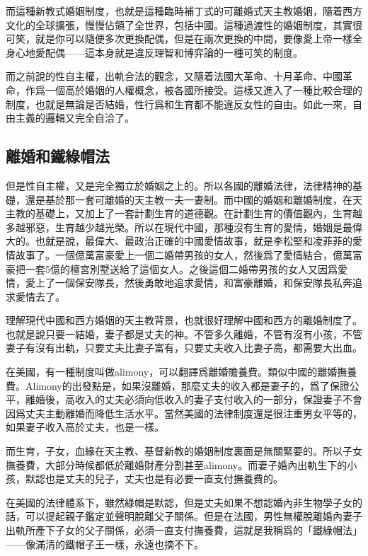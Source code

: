 而這種新教式婚姻制度，也就是這種臨時補丁式的可離婚式天主教婚姻，隨着西方文化的全球擴張，慢慢佔領了全世界，包括中國。這種過渡性的婚姻制度，其實很可笑，就是你可以隨便多次更換配偶，但是在兩次更換的中間，要像愛上帝一樣全身心地愛配偶——這本身就是違反理智和博弈論的一種可笑的制度。

而之前說的性自主權，出軌合法的觀念，又隨着法國大革命、十月革命、中國革命，作爲一個高於婚姻的人權概念，被各國所接受。這樣又進入了一種比較合理的制度，也就是無論是否結婚，性行爲和生育都不能違反女性的自由。如此一來，自由主義的邏輯又完全自洽了。

\subsection{離婚和鐵綠帽法}

但是性自主權，又是完全獨立於婚姻之上的。所以各國的離婚法律，法律精神的基礎，還是基於那一套可離婚的天主教一夫一妻制。而中國的婚姻和離婚制度，在天主教的基礎上，又加上了一套計劃生育的道德觀。在計劃生育的價值觀內，生育越多越邪惡，生育越少越光榮。所以在現代中國，那種沒有生育的愛情，婚姻是最偉大的。也就是說，最偉大、最政治正確的中國愛情故事，就是李松堅和凌菲菲的愛情故事了。一個億萬富豪愛上一個二婚帶男孩的女人，然後爲了愛情結合，億萬富豪把一套5億的檀宮別墅送給了這個女人。之後這個二婚帶男孩的女人又因爲愛情，愛上了一個保安隊長，然後勇敢地追求愛情，和富豪離婚，和保安隊長私奔追求愛情去了。

理解現代中國和西方婚姻的天主教背景，也就很好理解中國和西方的離婚制度了。也就是說只要一結婚，妻子都是丈夫的神。不管多久離婚，不管有沒有小孩，不管妻子有沒有出軌，只要丈夫比妻子富有，只要丈夫收入比妻子高，都需要大出血。

在美國，有一種制度叫做alimony，可以翻譯爲離婚贍養費。類似中國的離婚撫養費。Alimony的出發點是，如果沒離婚，那麼丈夫的收入都是妻子的，爲了保證公平，離婚後，高收入的丈夫必須向低收入的妻子支付收入的一部分，保證妻子不會因爲丈夫主動離婚而降低生活水平。當然美國的法律制度還是很注重男女平等的，如果妻子收入高於丈夫，也是一樣。

而生育，子女，血緣在天主教、基督新教的婚姻制度裏面是無關緊要的。所以子女撫養費，大部分時候都低於離婚財產分割甚至alimony。而妻子婚內出軌生下的小孩，默認也是丈夫的兒子，丈夫也是有必要一直支付撫養費的。

在美國的法律體系下，雖然綠帽是默認，但是丈夫如果不想認婚內非生物學子女的話，可以提起親子鑑定並聲明脫離父子關係。但是在法國，男性無權脫離婚內妻子出軌所產下子女的父子關係，必須一直支付撫養費，這就是我稱爲的「鐵綠帽法」——像滿清的鐵帽子王一樣，永遠也摘不下。

